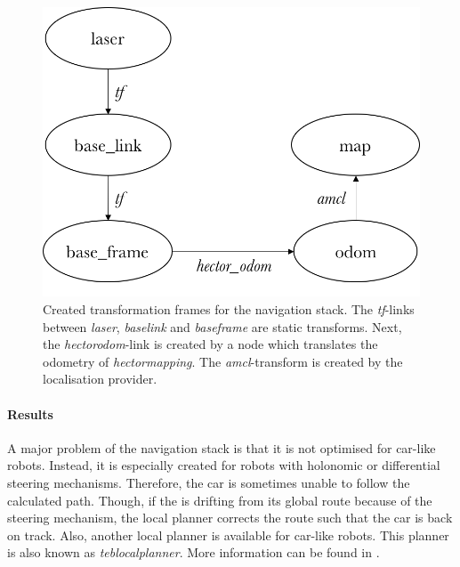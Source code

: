 \documentclass[conference,a4paper]{IEEEtran}
\begin{document}
\begin{figure}[!t]
    \includegraphics[width=\columnwidth]{navstack_tf}
    \centering
    \caption{Created transformation frames for the navigation stack. The \emph{tf}-links between \emph{laser}, \emph{base\textunderscore link} and \emph{base\textunderscore frame} are static transforms. Next, the \emph{hector\textunderscore odom}-link is created by a node which translates the odometry of \emph{hector\textunderscore mapping}. The \emph{amcl}-transform is created by the localisation provider.}
    \label{fig:navstack_tf}
\end{figure}

\paragraph{Results}
A major problem of the navigation stack is that it is not optimised for car-like robots. Instead, it is especially created for robots with holonomic or differential steering mechanisms. Therefore, the car is sometimes unable to follow the calculated path. Though, if the is drifting from its global route because of the steering mechanism, the local planner corrects the route such that the car is back on track. Also, another local planner is available for car-like robots. This planner is also known as \emph{teb\textunderscore local\textunderscore planner}. More information can be found in \cite{Rosmann2016}.
\end{document}
